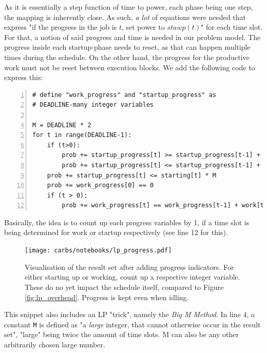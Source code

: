 As it is essentially a step function of time to power, each phase being one step, the mapping is inherently close. 
As such, \emph{a lot} of equations were needed that express "if the progress in the job is $t$, set power to $stawp(t)$" for each time slot. 
For that, a notion of said progress and time is needed in our problem model.
The progress inside each startup-phase needs to reset, as that can happen multiple times during the schedule. 
On the other hand, the progress for the productive work must not be reset between execution blocks. 
We add the following code to express this:

\begin{minipage}{\linewidth}
\begin{lstlisting}[frame=single, numbers=left, caption={Progress Variables in LP}, label={list:lp_progress}, basicstyle=\ttfamily, breaklines]
# define "work_progress" and "startup_progress" as 
# DEADLINE-many integer variables

M = DEADLINE * 2
for t in range(DEADLINE-1):
    if (t>0):
        prob += startup_progress[t] >= startup_progress[t-1] + 1 - (1 - starting[t]) * M 
        prob += startup_progress[t] <= startup_progress[t-1] + 1 + (1 - starting[t]) * M
    prob += startup_progress[t] <= starting[t] * M 
    prob += work_progress[0] == 0
    if (t > 0):
        prob += work_progress[t] == work_progress[t-1] + work[t]
\end{lstlisting}
\end{minipage}

Basically, the idea is to count up each progress variables by 1, if a time slot is being determined for work or startup respectively (see line 12 for this).

\begin{figure}[H]
    \texttt{[image: carbs/notebooks/lp\_progress.pdf]}
    \caption{Visualisation of the result set after adding progress indicators. For either starting up or working, count up a respective integer variable. These do no yet impact the schedule itself, compared to Figure \ref{fig:lp_overhead}. Progress is kept even when idling.}
    \label{fig:lp_progress}
\end{figure}

This snippet also includes an LP "trick", namely the \emph{Big M Method}. 
In line 4, a constant \verb|M| is defined as "a \emph{large} integer, that cannot otherwise occur in the result set", "large" being twice the amount of time slots. 
M can also be any other arbitrarily chosen large number.

